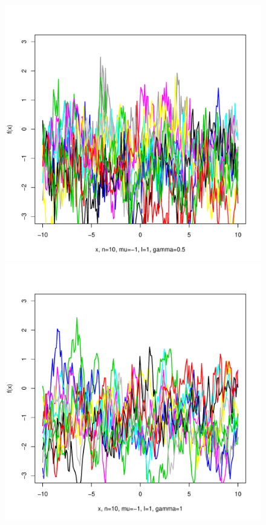\documentclass[12pt,letterpaper]{article}
\begin{document}
\begin{figure}
\begin{center}
\includegraphics[scale=0.2]{hw321/n10-m-1-l1-g1.pdf}
\includegraphics[scale=0.2]{hw321/n10-m-1-l1-g2.pdf}

\end{center}
\end{figure}
\end{document}
